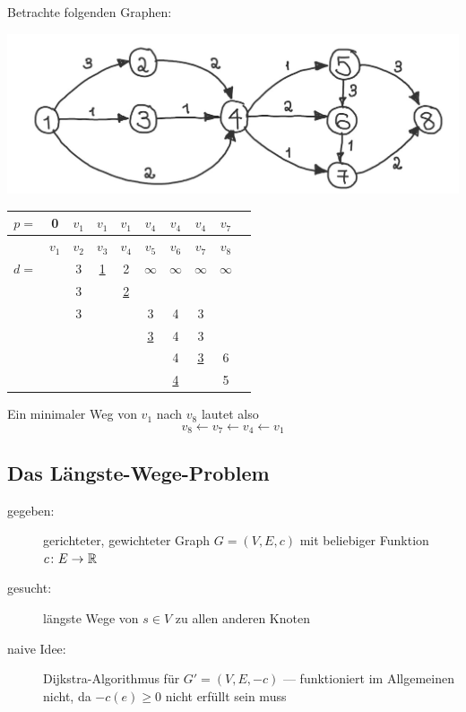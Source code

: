 \begin{beispiel}
	Betrachte folgenden Graphen:

	\begin{minipage}{\dimexpr0.5\linewidth-\fboxrule-\fboxsep}
		\centering
		\includegraphics[width=\linewidth]{./img/optinum_5_3_bsp5-2.jpg}
	\end{minipage}
	\begin{minipage}{\dimexpr0.5\linewidth-\fboxrule-\fboxsep}
		\begin{tabular}{rccccccccc}
			$p =$ & 0 & $v_1$ & $v_1$ & $v_1$ & $v_4$ & $v_4$ & $v_4$ & \cancel{$v_5$} $v_7$ \\ \hline
			    & $v_1$ & $v_2$ & $v_3$ & $v_4$ & $v_5$ & $v_6$ & $v_7$ & $v_8$ \\ \hline
			$d =$ & \fbox{0} & 3 & \uline{1} & 2 & $\infty$ & $\infty$ & $\infty$ & $\infty$ \\
				&          & 3 &           & \uline{2} & &  & &  \\
				&          & 3 &           &        & 3         & 4 & 3 & \\
				&          &   &           &        & \uline{3} & 4 & 3 & \\
				&          &   &           &        &           & 4 & \uline{3} & 6 \\
				&          &   &           &        &           & \uline{4} &           & 5 \\
		\end{tabular}
	\end{minipage}

	Ein minimaler Weg von $v_1$ nach $v_8$ lautet also
	\begin{equation*}
		v_8 \leftarrow v_7 \leftarrow v_4 \leftarrow v_1
	\end{equation*}
\end{beispiel}


\subsection{Das Längste-Wege-Problem}
\begin{description}
	\item[gegeben:] gerichteter, gewichteter Graph $G = (V,E,c)$ mit beliebiger Funktion $\abb{c}{E}{\R}$
	\item[gesucht:] längste Wege von $s \in V$ zu allen anderen Knoten
	\item[naive Idee:] Dijkstra-Algorithmus für $G' = (V,E,-c)$ --- funktioniert im Allgemeinen nicht, da $-c(e) \ge 0$ nicht erfüllt sein muss
\end{description}

